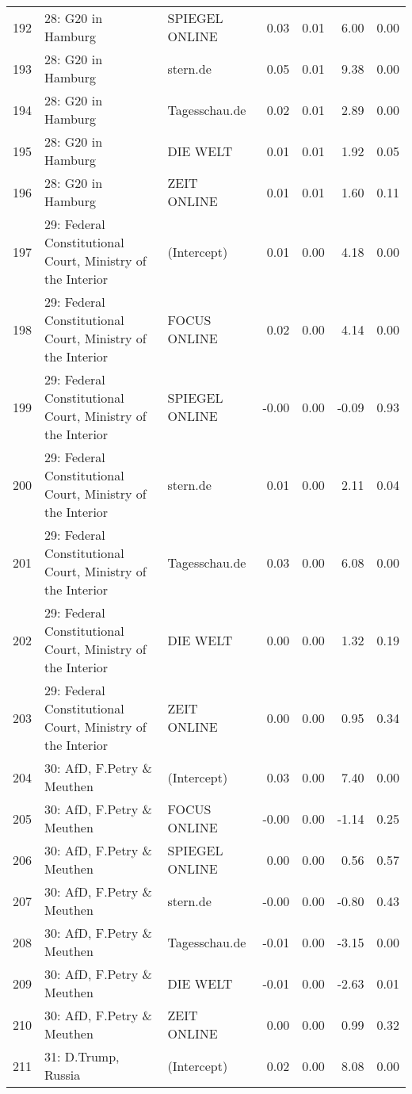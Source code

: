 \begin{table}[ht]
{\begin{tabular}{rllrrrr}
  192 & 28: G20 in Hamburg & SPIEGEL ONLINE & 0.03 & 0.01 & 6.00 & 0.00 \\ 
  193 & 28: G20 in Hamburg & stern.de & 0.05 & 0.01 & 9.38 & 0.00 \\ 
  194 & 28: G20 in Hamburg & Tagesschau.de & 0.02 & 0.01 & 2.89 & 0.00 \\ 
  195 & 28: G20 in Hamburg & DIE WELT & 0.01 & 0.01 & 1.92 & 0.05 \\ 
  196 & 28: G20 in Hamburg & ZEIT ONLINE & 0.01 & 0.01 & 1.60 & 0.11 \\ 
  197 & 29: Federal Constitutional Court, Ministry of the Interior & (Intercept) & 0.01 & 0.00 & 4.18 & 0.00 \\ 
  198 & 29: Federal Constitutional Court, Ministry of the Interior & FOCUS ONLINE & 0.02 & 0.00 & 4.14 & 0.00 \\ 
  199 & 29: Federal Constitutional Court, Ministry of the Interior & SPIEGEL ONLINE & -0.00 & 0.00 & -0.09 & 0.93 \\ 
  200 & 29: Federal Constitutional Court, Ministry of the Interior & stern.de & 0.01 & 0.00 & 2.11 & 0.04 \\ 
  201 & 29: Federal Constitutional Court, Ministry of the Interior & Tagesschau.de & 0.03 & 0.00 & 6.08 & 0.00 \\ 
  202 & 29: Federal Constitutional Court, Ministry of the Interior & DIE WELT & 0.00 & 0.00 & 1.32 & 0.19 \\ 
  203 & 29: Federal Constitutional Court, Ministry of the Interior & ZEIT ONLINE & 0.00 & 0.00 & 0.95 & 0.34 \\ 
  204 & 30: AfD, F.Petry \& Meuthen & (Intercept) & 0.03 & 0.00 & 7.40 & 0.00 \\ 
  205 & 30: AfD, F.Petry \& Meuthen & FOCUS ONLINE & -0.00 & 0.00 & -1.14 & 0.25 \\ 
  206 & 30: AfD, F.Petry \& Meuthen & SPIEGEL ONLINE & 0.00 & 0.00 & 0.56 & 0.57 \\ 
  207 & 30: AfD, F.Petry \& Meuthen & stern.de & -0.00 & 0.00 & -0.80 & 0.43 \\ 
  208 & 30: AfD, F.Petry \& Meuthen & Tagesschau.de & -0.01 & 0.00 & -3.15 & 0.00 \\ 
  209 & 30: AfD, F.Petry \& Meuthen & DIE WELT & -0.01 & 0.00 & -2.63 & 0.01 \\ 
  210 & 30: AfD, F.Petry \& Meuthen & ZEIT ONLINE & 0.00 & 0.00 & 0.99 & 0.32 \\ 
  211 & 31: D.Trump, Russia & (Intercept) & 0.02 & 0.00 & 8.08 & 0.00 \\ 

\end{tabular}}
\end{table}
